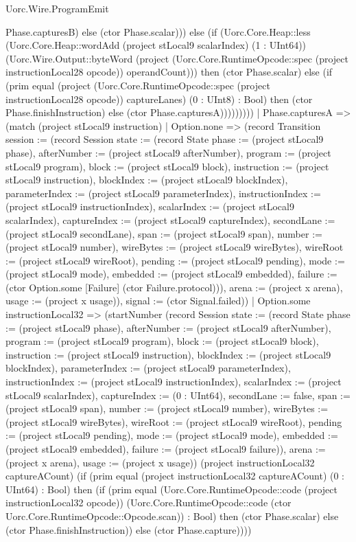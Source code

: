 \begin{lexlean}{Uorc.Wire.ProgramEmit}
\begin{semanticmodule}
{Phase.capturesB) else (ctor Phase.scalar))) else (if (Uorc.Core.Heap::less (Uorc.Core.Heap::wordAdd (project stLocal9 scalarIndex) (1 : UInt64)) (Uorc.Wire.Output::byteWord (project (Uorc.Core.RuntimeOpcode::spec (project instructionLocal28 opcode)) operandCount))) then (ctor Phase.scalar) else (if (prim equal (project (Uorc.Core.RuntimeOpcode::spec (project instructionLocal28 opcode)) captureLanes) (0 : UInt8) : Bool) then (ctor Phase.finishInstruction) else (ctor Phase.capturesA)))))))))
        | Phase.capturesA => (match (project stLocal9 instruction)
          | Option.none => (record Transition {session := (record Session {state := (record State {phase := (project stLocal9 phase), afterNumber := (project stLocal9 afterNumber), program := (project stLocal9 program), block := (project stLocal9 block), instruction := (project stLocal9 instruction), blockIndex := (project stLocal9 blockIndex), parameterIndex := (project stLocal9 parameterIndex), instructionIndex := (project stLocal9 instructionIndex), scalarIndex := (project stLocal9 scalarIndex), captureIndex := (project stLocal9 captureIndex), secondLane := (project stLocal9 secondLane), span := (project stLocal9 span), number := (project stLocal9 number), wireBytes := (project stLocal9 wireBytes), wireRoot := (project stLocal9 wireRoot), pending := (project stLocal9 pending), mode := (project stLocal9 mode), embedded := (project stLocal9 embedded), failure := (ctor Option.some [Failure] (ctor Failure.protocol))}), arena := (project x arena), usage := (project x usage)}), signal := (ctor Signal.failed)})
          | Option.some instructionLocal32 => (startNumber (record Session {state := (record State {phase := (project stLocal9 phase), afterNumber := (project stLocal9 afterNumber), program := (project stLocal9 program), block := (project stLocal9 block), instruction := (project stLocal9 instruction), blockIndex := (project stLocal9 blockIndex), parameterIndex := (project stLocal9 parameterIndex), instructionIndex := (project stLocal9 instructionIndex), scalarIndex := (project stLocal9 scalarIndex), captureIndex := (0 : UInt64), secondLane := false, span := (project stLocal9 span), number := (project stLocal9 number), wireBytes := (project stLocal9 wireBytes), wireRoot := (project stLocal9 wireRoot), pending := (project stLocal9 pending), mode := (project stLocal9 mode), embedded := (project stLocal9 embedded), failure := (project stLocal9 failure)}), arena := (project x arena), usage := (project x usage)}) (project instructionLocal32 captureACount) (if (prim equal (project instructionLocal32 captureACount) (0 : UInt64) : Bool) then (if (prim equal (Uorc.Core.RuntimeOpcode::code (project instructionLocal32 opcode)) (Uorc.Core.RuntimeOpcode::code (ctor Uorc.Core.RuntimeOpcode::Opcode.scan)) : Bool) then (ctor Phase.scalar) else (ctor Phase.finishInstruction)) else (ctor Phase.capture))))
}
\end{semanticmodule}
\end{lexlean}
